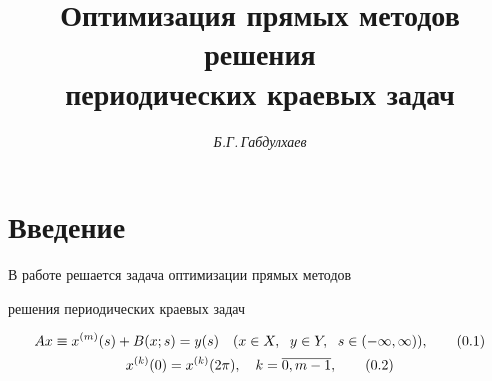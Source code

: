 \setcounter{page}{55}















\author{\it Б.Г.\,Габдулхаев}




\title{Оптимизация прямых методов решения\\


периодических краевых задач}





\date{}




\pagestyle{plain} %







\maketitle


\label{begin}








\section*{Введение}





В работе решается задача оптимизации прямых методов


решения периодических краевых задач


\begin{gather}


Ax\equiv x^{(m)}(s)+B(x;s) = y(s) \quad


(x\in X,\ \; y\in Y,\ \; s\in (-\infty,\infty)), \tag{0.1} \\


%


x^{(k)}(0) = x^{(k)}(2\pi),\quad k=\ol{0,m-1},\tag{0.2}


\end{gather}


